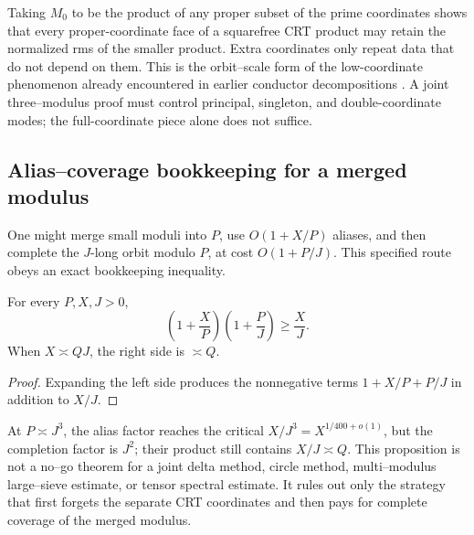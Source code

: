 Taking \(M_0\) to be the product of any proper subset of the prime
coordinates shows that every proper-coordinate face of a squarefree CRT
product may retain the normalized rms of the smaller product.  Extra
coordinates only repeat data that do not depend on them.
This is the orbit--scale form of the low-coordinate phenomenon already
encountered in earlier conductor decompositions
\citep{WangTPC22,WangTPC24}.  A joint three--modulus proof must control
principal, singleton, and double-coordinate modes; the full-coordinate
piece alone does not suffice.

\subsection{Alias--coverage bookkeeping for a merged modulus}

One might merge small moduli into \(P\), use
\(O(1+X/P)\) aliases, and then complete the \(J\)-long orbit modulo \(P\),
at cost \(O(1+P/J)\).  This specified route obeys an exact bookkeeping
inequality.

\begin{proposition}
\label{prop:tpc35-alias-coverage-law}
For every \(P,X,J>0\),
\begin{equation}
 \boxed{
 \left(1+\frac XP\right)
 \left(1+\frac PJ\right)
 \ge\frac XJ.}
 \label{eq:tpc35-alias-coverage-law}
\end{equation}
When \(X\asymp QJ\), the right side is \(\asymp Q\).
\end{proposition}

\begin{proof}
Expanding the left side produces the nonnegative terms
\(1+X/P+P/J\) in addition to \(X/J\).
\end{proof}

At \(P\asymp J^3\), the alias factor reaches the critical
\(X/J^3=X^{1/400+o(1)}\), but the completion factor is \(J^2\); their
product still contains \(X/J\asymp Q\).  This proposition is not a no--go
theorem for a joint delta method, circle method, multi--modulus
large--sieve estimate, or tensor spectral estimate.  It rules out only
the strategy that
first forgets the separate CRT coordinates and then pays for complete
coverage of the merged modulus.
